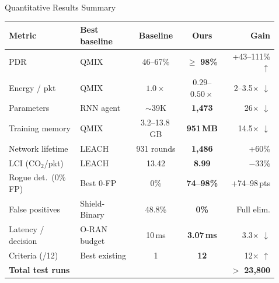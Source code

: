 \documentclass[final]{beamer}
\newlength{\sepwidth}
\newlength{\colwidth}
\newcommand{\separatorcolumn}{\begin{column}{\sepwidth}\end{column}}
\begin{document}
\begin{frame}[t]
\begin{columns}[t]
\begin{column}{\colwidth}
\end{column}

\separatorcolumn

\begin{column}{\colwidth}

  \begin{block}{Quantitative Results Summary}
    \footnotesize
    \begin{table}
      \centering
      \renewcommand{\arraystretch}{1.1}
      \begin{tabular}{llccr}
        \toprule
        \textbf{Metric} & \textbf{Best baseline} & \textbf{Baseline} & \textbf{Ours} & \textbf{Gain} \\
        \midrule
        PDR & QMIX & 46--67\% & $\geq$ \textbf{98\%} & +43--111\% $\uparrow$ \\
        Energy / pkt & QMIX & $1.0\times$ & $0.29$--$0.50\times$ & 2--3.5$\times$ $\downarrow$ \\
        Parameters & RNN agent & $\sim$39K & \textbf{1,473} & 26$\times$ $\downarrow$ \\
        Training memory & QMIX & 3.2--13.8\,GB & \textbf{951\,MB} & 14.5$\times$ $\downarrow$ \\
        Network lifetime & LEACH & 931 rounds & \textbf{1,486} & +60\% \\
        LCI (CO$_2$/pkt) & LEACH & 13.42 & \textbf{8.99} & $-$33\% \\
        Rogue det.\ (0\% FP) & Best 0-FP & 0\% & \textbf{74--98\%} & +74--98\,pts \\
        False positives & Shield-Binary & 48.8\% & \textbf{0\%} & Full elim. \\
        Latency / decision & O-RAN budget & 10\,ms & \textbf{3.07\,ms} & 3.3$\times$ $\downarrow$ \\
        Criteria (/12) & Best existing & 1 & \textbf{12} & 12$\times$ $\uparrow$ \\
        \midrule
        \multicolumn{4}{l}{\textbf{Total test runs}} & $>$ \textbf{23,800} \\
        \bottomrule
      \end{tabular}
    \end{table}
  \end{block}


\end{column}
\end{columns}
\end{frame}
\end{document}
